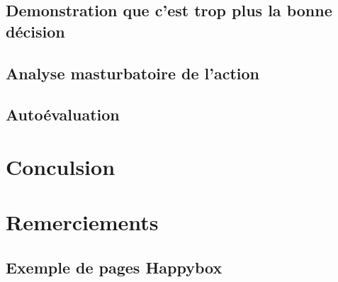 \documentclass[11pt, a4paper ]{report}
\begin{document}
		\section{Demonstration que c'est trop plus la bonne décision} %

		\section{Analyse masturbatoire de l'action} %

		\section{Autoévaluation}

	\chapter*{Conculsion} %

	\chapter*{Remerciements}

	\appendix
	\section{Exemple de pages Happybox}
	\printindex

	
	
\end{document}
